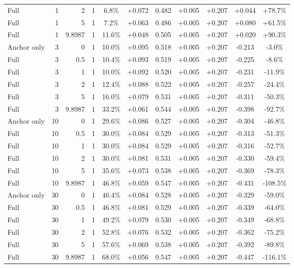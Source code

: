 \begin{table}[htbp]
\begin{tabular}{lrrrccccccc}
Full & 1 & 2 & 1 & 6.8\% & +0.072 & 0.482 & +0.005 & +0.207 & +0.044 & +78.7\% \\
Full & 1 & 5 & 1 & 7.2\% & +0.063 & 0.486 & +0.005 & +0.207 & +0.080 & +61.5\% \\
Full & 1 & 9.8987 & 1 & 11.6\% & +0.048 & 0.505 & +0.005 & +0.207 & +0.020 & +90.3\% \\
Anchor only & 3 & 0 & 1 & 10.0\% & +0.095 & 0.518 & +0.005 & +0.207 & -0.213 & -3.0\% \\
Full & 3 & 0.5 & 1 & 10.4\% & +0.093 & 0.519 & +0.005 & +0.207 & -0.225 & -8.6\% \\
Full & 3 & 1 & 1 & 10.0\% & +0.092 & 0.520 & +0.005 & +0.207 & -0.231 & -11.9\% \\
Full & 3 & 2 & 1 & 12.4\% & +0.088 & 0.522 & +0.005 & +0.207 & -0.257 & -24.4\% \\
Full & 3 & 5 & 1 & 16.0\% & +0.079 & 0.531 & +0.005 & +0.207 & -0.311 & -50.3\% \\
Full & 3 & 9.8987 & 1 & 33.2\% & +0.061 & 0.544 & +0.005 & +0.207 & -0.398 & -92.7\% \\
Anchor only & 10 & 0 & 1 & 29.6\% & +0.086 & 0.527 & +0.005 & +0.207 & -0.304 & -46.8\% \\
Full & 10 & 0.5 & 1 & 30.0\% & +0.084 & 0.529 & +0.005 & +0.207 & -0.313 & -51.3\% \\
Full & 10 & 1 & 1 & 30.0\% & +0.084 & 0.529 & +0.005 & +0.207 & -0.316 & -52.7\% \\
Full & 10 & 2 & 1 & 30.0\% & +0.081 & 0.531 & +0.005 & +0.207 & -0.330 & -59.4\% \\
Full & 10 & 5 & 1 & 35.6\% & +0.073 & 0.538 & +0.005 & +0.207 & -0.369 & -78.3\% \\
Full & 10 & 9.8987 & 1 & 46.8\% & +0.059 & 0.547 & +0.005 & +0.207 & -0.431 & -108.5\% \\
Anchor only & 30 & 0 & 1 & 46.4\% & +0.084 & 0.528 & +0.005 & +0.207 & -0.329 & -59.0\% \\
Full & 30 & 0.5 & 1 & 46.8\% & +0.081 & 0.529 & +0.005 & +0.207 & -0.339 & -64.0\% \\
Full & 30 & 1 & 1 & 49.2\% & +0.079 & 0.530 & +0.005 & +0.207 & -0.349 & -68.8\% \\
Full & 30 & 2 & 1 & 52.8\% & +0.076 & 0.532 & +0.005 & +0.207 & -0.362 & -75.2\% \\
Full & 30 & 5 & 1 & 57.6\% & +0.069 & 0.538 & +0.005 & +0.207 & -0.392 & -89.8\% \\
Full & 30 & 9.8987 & 1 & 68.0\% & +0.056 & 0.547 & +0.005 & +0.207 & -0.447 & -116.1\% \\

\end{tabular}
\end{table}
